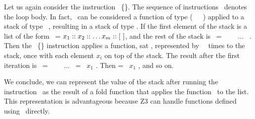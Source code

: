 \documentclass[a4paper,USenglish,cleveref, autoref, thm-restate]{lipics-v2021}
\begin{document}
Let us again consider the instruction \ITER\
\{\INSTRUCTION\}. The sequence of instructions \INSTRUCTION\ denotes
the loop body. In fact, \INSTRUCTION\ can be considered a function of
type (\TY\ \STACKCONCAT \TYA\ \SRightarrow\ \TYA) applied to a stack
of type \TY\ \STACKCONCAT \TYA,
resulting in a stack of type \TYA. If the first element of
the stack is a list of the form \LIST\ = $x_1 :: x_2 ::
\dots x_m ::  [\ ]$, and the rest of the stack is \STACKZERO\ =
\StackOne\  \STACKCONCAT\ \StackTwo\ \STACKCONCAT\ ... \STACKCONCAT\
\StackN. Then the \ITER\ \{\INSTRUCTION\} instruction applies a 
function, sat \F, represented by \INSTRUCTION\ \M\ times to the stack, once
with each element $x_i$ on top of the stack. The result after 
the first iteration is \STACKONE\ = \StackOneOne\  \STACKCONCAT\
\StackTwoOne\ \STACKCONCAT\ ... \STACKCONCAT\ \StackNOne = \F\ $x_1$
\STACK. Then \STACKTWO = \F\ $x_1$ \STACKONE, and so on.


We conclude, we can represent the value of the stack after running the
instruction \ITER\  as the result of a fold function that applies the
function \F\ to the list. This representation is advantageous because
Z3 can handle functions defined using \FOLD\ directly.
\end{document}
